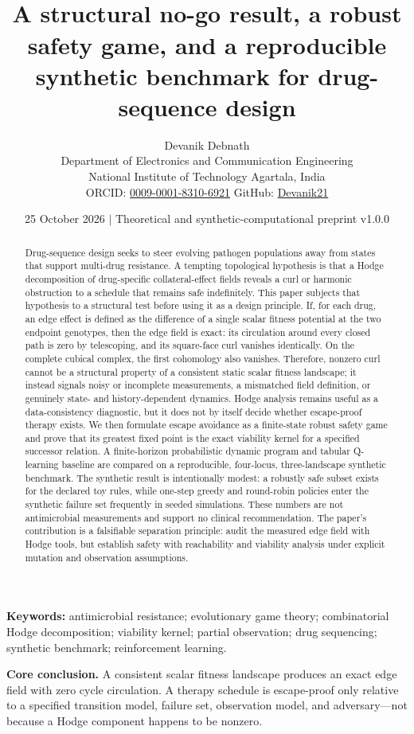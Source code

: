 \documentclass[11pt]{article}
\title{\vspace{-1.1cm}{\Huge\bfseries\color{ink}The Hodge Obstruction to Escape-Proof Therapy}\\[0.45em]{\large\color{muted}A structural no-go result, a robust safety game, and a reproducible synthetic benchmark for drug-sequence design}}
\author{Devanik Debnath\\[-0.1em]\small Department of Electronics and Communication Engineering\\\small National Institute of Technology Agartala, India\\\small ORCID: \href{https://orcid.org/0009-0001-8310-6921}{0009-0001-8310-6921} \quad GitHub: \href{https://github.com/Devanik21}{Devanik21}}
\date{25 October 2026 \quad $\vert$ \quad Theoretical and synthetic-computational preprint v1.0.0}
\theoremstyle{definition}\newtheorem{definition}[proposition]{Definition}\theoremstyle{remark}\newtheorem{remark}[proposition]{Remark}
\begin{document}
\maketitle
\begin{abstract}
Drug-sequence design seeks to steer evolving pathogen populations away from states that support multi-drug resistance. A tempting topological hypothesis is that a Hodge decomposition of drug-specific collateral-effect fields reveals a curl or harmonic obstruction to a schedule that remains safe indefinitely. This paper subjects that hypothesis to a structural test before using it as a design principle. If, for each drug, an edge effect is defined as the difference of a single scalar fitness potential at the two endpoint genotypes, then the edge field is exact: its circulation around every closed path is zero by telescoping, and its square-face curl vanishes identically. On the complete cubical complex, the first cohomology also vanishes. Therefore, nonzero curl cannot be a structural property of a consistent static scalar fitness landscape; it instead signals noisy or incomplete measurements, a mismatched field definition, or genuinely state- and history-dependent dynamics. Hodge analysis remains useful as a data-consistency diagnostic, but it does not by itself decide whether escape-proof therapy exists. We then formulate escape avoidance as a finite-state robust safety game and prove that its greatest fixed point is the exact viability kernel for a specified successor relation. A finite-horizon probabilistic dynamic program and tabular Q-learning baseline are compared on a reproducible, four-locus, three-landscape synthetic benchmark. The synthetic result is intentionally modest: a robustly safe subset exists for the declared toy rules, while one-step greedy and round-robin policies enter the synthetic failure set frequently in seeded simulations. These numbers are not antimicrobial measurements and support no clinical recommendation. The paper's contribution is a falsifiable separation principle: audit the measured edge field with Hodge tools, but establish safety with reachability and viability analysis under explicit mutation and observation assumptions.
\end{abstract}
\noindent\textbf{Keywords:} antimicrobial resistance; evolutionary game theory; combinatorial Hodge decomposition; viability kernel; partial observation; drug sequencing; synthetic benchmark; reinforcement learning.
\begin{keybox}\textbf{Core conclusion.} A consistent scalar fitness landscape produces an exact edge field with zero cycle circulation. A therapy schedule is escape-proof only relative to a specified transition model, failure set, observation model, and adversary—not because a Hodge component happens to be nonzero.\end{keybox}
\end{document}
